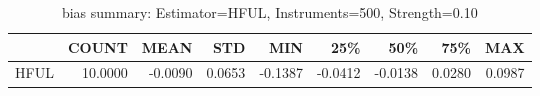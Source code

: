 \begin{table}[ht]
\centering
\caption{bias summary: Estimator=HFUL, Instruments=500, Strength=0.10}
\begin{tabular}{lrrrrrrrr}
\toprule
 & COUNT & MEAN & STD & MIN & 25\% & 50\% & 75\% & MAX \\
\midrule
HFUL & 10.0000 & -0.0090 & 0.0653 & -0.1387 & -0.0412 & -0.0138 & 0.0280 & 0.0987 \\
\bottomrule
\end{tabular}
\end{table}

